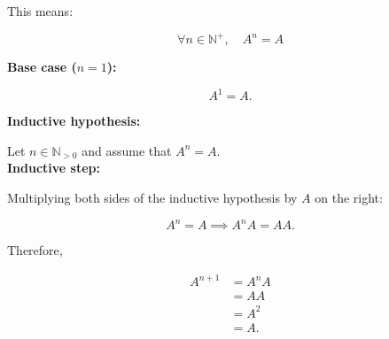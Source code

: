 This means:

    $$
    \boxed{\forall n\in\mathbb{N^+},\quad A^n=A}
    $$

    \textbf{Base case ($n=1$):}

    $$
    A^1=A.
    $$

    \textbf{Inductive hypothesis:}

    Let $n\in\mathbb{N}_{>0}$ and assume that $A^n=A$.\\

    \textbf{Inductive step:}

    Multiplying both sides of the inductive hypothesis
    by $A$ on the right:

    $$
    A^n=A \implies A^nA=AA.
    $$

    Therefore,

    $$
    \begin{aligned}
        A^{n+1}
        &= A^nA \\
        &= AA \\
        &= A^2 \\
        &= A.
    \end{aligned}
    $$
